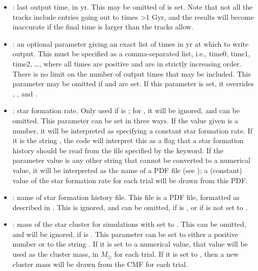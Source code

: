 \documentclass[letterpaper,10pt,english]{sphinxmanual}
\begin{document}
\begin{itemize}
\item {} 
: last output time, in yr. This may be omitted of  is set. Note that not all the tracks include entries going out to times \textgreater{}1 Gyr, and the results will become inaccurate if the final time is larger than the tracks allow.

\item {} 
: an optional parameter giving an exact list of times in yr at which to write output. This must be specified as a comma-separated list, i.e., time0, time1, time2, …, where all times are positive and are in strictly increasing order. There is no limit on the number of output times that may be included. This parameter may be omitted if  and  are set. If this parameter is set, it overrides , , and .

\item {} 
: star formation rate. Only used if  is ; for , it will be ignored, and can be omitted. This parameter can be set in three ways. If the value given is a number, it will be interpreted as specifying a constant star formation rate. If it is the string , the code will interpret this as a flag that a star formation history should be read from the file specified by the  keyword. If the parameter value is any other string that cannot be converted to a numerical value, it will be interpreted as the name of a PDF file (see {\hyperref[\detokenize{pdfs:sec-pdfs}]{}}); a (constant) value of the star formation rate for each trial will be drawn from this PDF.

\item {} 
: name of star formation history file. This file is a PDF file, formatted as described in {\hyperref[\detokenize{pdfs:sec-pdfs}]{}}. This is ignored, and can be omitted, if  is , or if  is not set to .

\item {} 
: mass of the star cluster for simulations with  set to . This can be omitted, and will be ignored, if  is . This parameter can be set to either a positive number or to the string . If it is set to a numerical value, that value will be used as the cluster mass, in \(M_\odot\) for each trial. If it is set to , then a new cluster mass will be drawn from the CMF for each trial.


\end{itemize}
\end{document}
